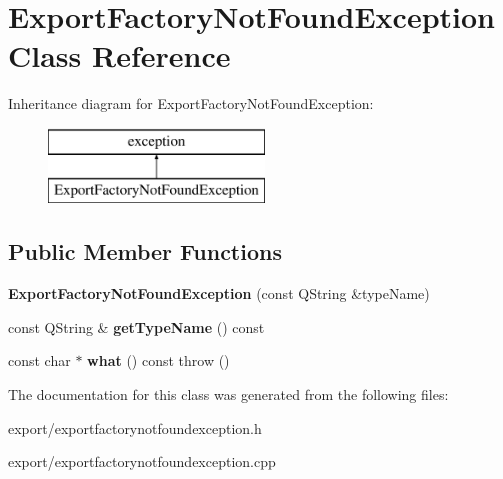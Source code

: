 \hypertarget{class_export_factory_not_found_exception}{\section{Export\-Factory\-Not\-Found\-Exception Class Reference}
\label{class_export_factory_not_found_exception}
}
Inheritance diagram for Export\-Factory\-Not\-Found\-Exception\-:\begin{figure}[H]
\begin{center}
\leavevmode
\includegraphics[height=2.000000cm]{class_export_factory_not_found_exception}
\end{center}
\end{figure}
\subsection*{Public Member Functions}
\begin{DoxyCompactItemize}
\item 
\hypertarget{class_export_factory_not_found_exception_ade83afbbcf6c57b8d2e7987583f8a0df}{{\bfseries Export\-Factory\-Not\-Found\-Exception} (const Q\-String \&type\-Name)}\label{class_export_factory_not_found_exception_ade83afbbcf6c57b8d2e7987583f8a0df}

\item 
\hypertarget{class_export_factory_not_found_exception_a244bdf14d9f9923f9068373e6f199a4e}{const Q\-String \& {\bfseries get\-Type\-Name} () const }\label{class_export_factory_not_found_exception_a244bdf14d9f9923f9068373e6f199a4e}

\item 
\hypertarget{class_export_factory_not_found_exception_abc47ce22b1187bf157d69b25b9cfc8fc}{const char $\ast$ {\bfseries what} () const   throw ()}\label{class_export_factory_not_found_exception_abc47ce22b1187bf157d69b25b9cfc8fc}

\end{DoxyCompactItemize}


The documentation for this class was generated from the following files\-:\begin{DoxyCompactItemize}
\item 
export/exportfactorynotfoundexception.\-h\item 
export/exportfactorynotfoundexception.\-cpp\end{DoxyCompactItemize}
